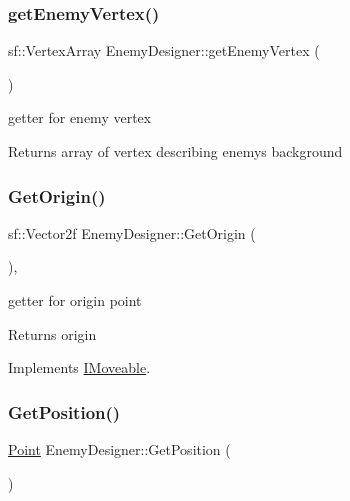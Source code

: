 \subsubsection{\texorpdfstring{get\+Enemy\+Vertex()}{getEnemyVertex()}}
{\footnotesize\ttfamily sf\+::\+Vertex\+Array Enemy\+Designer\+::get\+Enemy\+Vertex (\begin{DoxyParamCaption}{ }\end{DoxyParamCaption})}



getter for enemy vertex 

\begin{DoxyReturn}{Returns}
array of vertex describing enemy\textquotesingle{}s background 
\end{DoxyReturn}
\mbox{\label{class_enemy_designer_a868f397544fe2415d1d6881e7b3acf92}} 
\subsubsection{\texorpdfstring{Get\+Origin()}{GetOrigin()}}
{\footnotesize\ttfamily sf\+::\+Vector2f Enemy\+Designer\+::\+Get\+Origin (\begin{DoxyParamCaption}{ }\end{DoxyParamCaption})\hspace{0.3cm}{\ttfamily [override]}, {\ttfamily [virtual]}}



getter for origin point 

\begin{DoxyReturn}{Returns}
origin 
\end{DoxyReturn}


Implements \mbox{\hyperlink{class_i_moveable}{I\+Moveable}}.

\mbox{\label{class_enemy_designer_a3ed8aa13f9da30df073e729ea4817dfe}} 
\subsubsection{\texorpdfstring{Get\+Position()}{GetPosition()}}
{\footnotesize\ttfamily \mbox{\hyperlink{class_point}{Point}} Enemy\+Designer\+::\+Get\+Position (\begin{DoxyParamCaption}{ }\end{DoxyParamCaption})}



